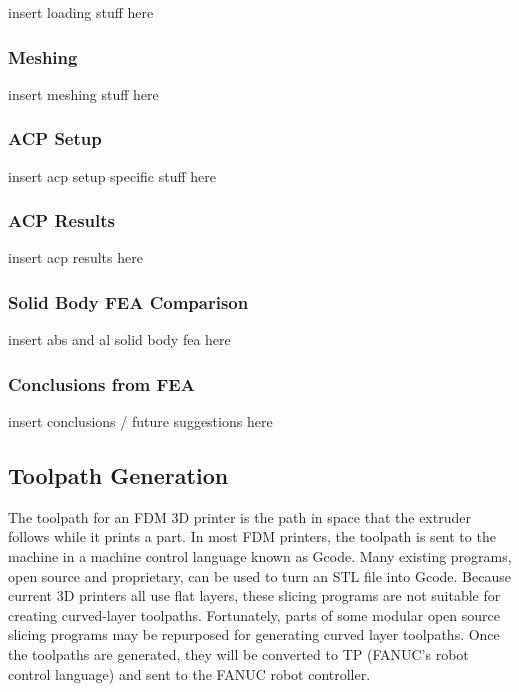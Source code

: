 insert loading stuff here

\subsubsection{Meshing}

insert meshing stuff here

\subsubsection{ACP Setup}

insert acp setup specific stuff here

\subsubsection{ACP Results}

insert acp results here

\subsubsection{Solid Body FEA Comparison}

insert abs and al solid body fea here

\subsubsection{Conclusions from FEA}

insert conclusions / future suggestions here

\subsection{Toolpath Generation}

\indent

The toolpath for an FDM 3D printer is the path in space that the extruder follows while it prints a part. In most FDM printers, the toolpath is sent to the machine in a machine control language known as Gcode. Many existing programs, open source and proprietary, can be used to turn an STL file into Gcode. Because current 3D printers all use flat layers, these slicing programs are not suitable for creating curved-layer toolpaths. Fortunately, parts of some modular open source slicing programs may be repurposed for generating curved layer toolpaths. Once the toolpaths are generated, they will be converted to TP (FANUC's robot control language) and sent to the FANUC robot controller. \\
